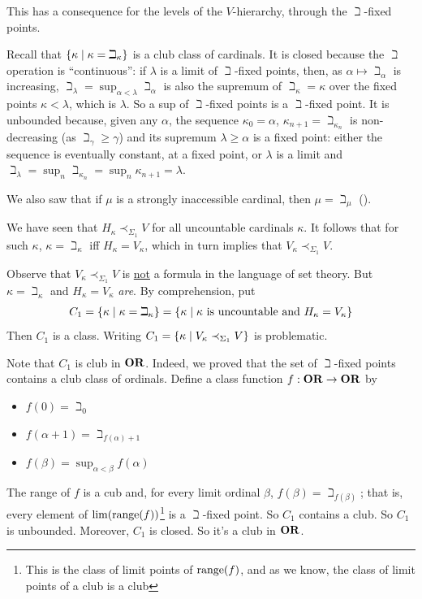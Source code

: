 This has a consequence for the levels of the $V$-hierarchy, through the $\beth$-fixed points.

Recall that $\left\{ \kappa \; \middle\vert \; \kappa = \beth_{\kappa} \right\}$ is a club class of cardinals. It is closed because the $\beth$ operation is ``continuous'': if $\lambda$ is a limit of $\beth$-fixed points, then, as $\alpha \mapsto \beth_{\alpha}$ is increasing, $\beth_{\lambda} = \sup_{\alpha < \lambda} \beth_{\alpha}$ is also the supremum of $\beth_{\kappa} = \kappa$ over the fixed points $\kappa < \lambda$, which is $\lambda$. So a sup of $\beth$-fixed points is a $\beth$-fixed point. It is unbounded because, given any $\alpha$, the sequence $\kappa_0 = \alpha$, $\kappa_{n + 1} = \beth_{\kappa_n}$ is non-decreasing (as $\beth_{\gamma} \geq \gamma$) and its supremum $\lambda \geq \alpha$ is a fixed point: either the sequence is eventually constant, at a fixed point, or $\lambda$ is a limit and $\beth_{\lambda} = \sup_{n} \beth_{\kappa_n} = \sup_n \kappa_{n + 1} = \lambda$.

We also saw that if $\mu$ is a strongly inaccessible cardinal, then $\mu = \beth_{\mu}$ ().

We have seen that $H_{\kappa} \prec_{\Sigma_1} V$ for all uncountable cardinals $\kappa$. It follows that for such $\kappa$, $\kappa = \beth_{\kappa}$ iff $H_{\kappa} = V_{\kappa}$, which in turn implies that $V_{\kappa} \prec_{\Sigma_1} V$.

Observe that $V_{\kappa} \prec_{\Sigma_1} V$ is \underline{not} a formula in the language of set theory. But $\kappa = \beth_{\kappa}$ and $H_{\kappa} = V_{\kappa}$ \textit{are}. By comprehension, put
\begin{align*}
    C_1 = \left\{ \kappa \; \middle\vert \; \kappa = \beth_{\kappa} \right\} = \left\{ \kappa \; \middle\vert \; \kappa \text{ is uncountable and } H_{\kappa} = V_{\kappa} \right\}
\end{align*}
Then $C_1$ is a class. Writing $C_1 = \left\{ \kappa \; \middle\vert \; V_{\kappa} \prec_{\Sigma_1} V \right\}$ is problematic.

Note that $C_1$ is club in $\mathbf{OR}$. Indeed, we proved that the set of $\beth$-fixed points contains a club class of ordinals. Define a class function $f : \mathbf{OR} \to \mathbf{OR}$ by
\begin{itemize}
    \item $f(0) = \beth_0$
    \item $f(\alpha + 1) = \beth_{f(\alpha) + 1}$
    \item $f(\beta) = \sup_{\alpha < \beta} f(\alpha)$
\end{itemize}
The range of $f$ is a cub and, for every limit ordinal $\beta$, $f(\beta) = \beth_{f(\beta)}$; that is, every element of $\lim\!\left( \operatorname{range}\!\left( f \right) \right)$\footnote{This is the class of limit points of $\operatorname{range}(f)$, and as we know, the class of limit points of a club is a club} is a $\beth$-fixed point. So $C_1$ contains a club. So $C_1$ is unbounded. Moreover, $C_1$ is closed. So it's a club in $\mathbf{OR}$.

